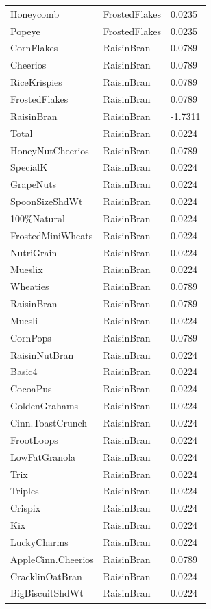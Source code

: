\begin{table}[!htbp]
\begin{tabular}{lll}
Honeycomb & FrostedFlakes & 0.0235
\\
Popeye & FrostedFlakes & 0.0235
\\
CornFlakes & RaisinBran & 0.0789
\\
Cheerios & RaisinBran & 0.0789
\\
RiceKrispies & RaisinBran & 0.0789
\\
FrostedFlakes & RaisinBran & 0.0789
\\
RaisinBran & RaisinBran & -1.7311
\\
Total & RaisinBran & 0.0224
\\
HoneyNutCheerios & RaisinBran & 0.0789
\\
SpecialK & RaisinBran & 0.0224
\\
GrapeNuts & RaisinBran & 0.0224
\\
SpoonSizeShdWt & RaisinBran & 0.0224
\\
100\%Natural & RaisinBran & 0.0224
\\
FrostedMiniWheats & RaisinBran & 0.0224
\\
NutriGrain & RaisinBran & 0.0224
\\
Mueslix & RaisinBran & 0.0224
\\
Wheaties & RaisinBran & 0.0789
\\
RaisinBran & RaisinBran & 0.0789
\\
Muesli & RaisinBran & 0.0224
\\
CornPops & RaisinBran & 0.0789
\\
RaisinNutBran & RaisinBran & 0.0224
\\
Basic4 & RaisinBran & 0.0224
\\
CocoaPus & RaisinBran & 0.0224
\\
GoldenGrahams & RaisinBran & 0.0224
\\
Cinn.ToastCrunch & RaisinBran & 0.0224
\\
FrootLoops & RaisinBran & 0.0224
\\
LowFatGranola & RaisinBran & 0.0224
\\
Trix & RaisinBran & 0.0224
\\
Triples & RaisinBran & 0.0224
\\
Crispix & RaisinBran & 0.0224
\\
Kix & RaisinBran & 0.0224
\\
LuckyCharms & RaisinBran & 0.0224
\\
AppleCinn.Cheerios & RaisinBran & 0.0789
\\
CracklinOatBran & RaisinBran & 0.0224
\\
BigBiscuitShdWt & RaisinBran & 0.0224

\end{tabular}
\end{table}
